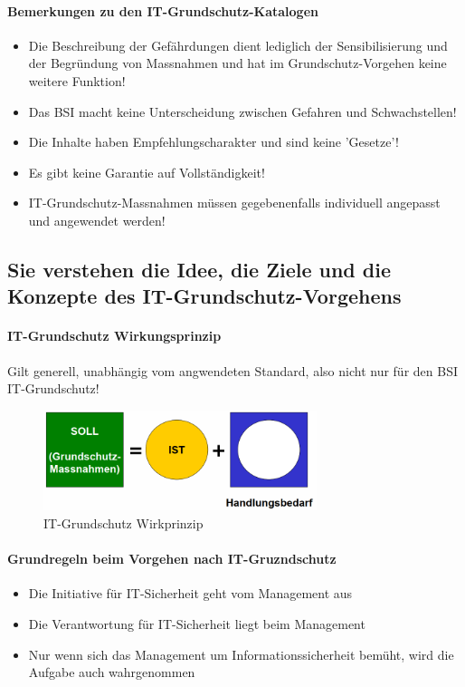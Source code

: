 \documentclass[10pt,a4paper]{article}
\begin{document}
\paragraph*{Bemerkungen zu den IT-Grundschutz-Katalogen}
\begin{itemize}[noitemsep,topsep=0pt,leftmargin=*]
    \item Die Beschreibung der Gefährdungen dient lediglich der Sensibilisierung und der Begründung von Massnahmen und hat im Grundschutz-Vorgehen keine weitere Funktion!
    \item Das BSI macht keine Unterscheidung zwischen Gefahren und Schwachstellen!
    \item Die Inhalte haben Empfehlungscharakter und sind keine 'Gesetze'!
    \item Es gibt keine Garantie auf Vollständigkeit!
    \item IT-Grundschutz-Massnahmen müssen gegebenenfalls individuell angepasst und angewendet werden!
\end{itemize}

\subsection*{Sie verstehen die Idee, die Ziele und die Konzepte des IT-Grundschutz-Vorgehens}

\paragraph*{IT-Grundschutz Wirkungsprinzip} Gilt generell, unabhängig vom angwendeten Standard, also nicht nur für den BSI IT-Grundschutz!
\begin{figure}[H]
    \begin{center}
    \includegraphics[width=8cm]{images/Grundschutz_Wirkprinzip.png}
    \caption{IT-Grundschutz Wirkprinzip}
    \label{IT-Grundschutz Wirkprinzip}
    \end{center}
\end{figure}

\paragraph*{Grundregeln beim Vorgehen nach IT-Gruzndschutz}
\begin{itemize}[noitemsep,topsep=0pt,leftmargin=*]
    \item Die Initiative für IT-Sicherheit geht vom Management aus
    \item Die Verantwortung für IT-Sicherheit liegt beim Management
    \item Nur wenn sich das Management um Informationssicherheit bemüht, wird die Aufgabe auch wahrgenommen
\end{itemize}
\end{document}
